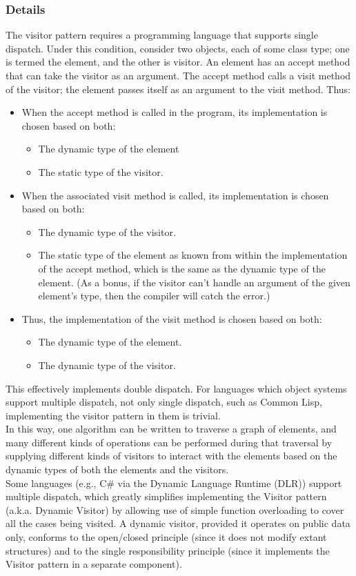 \subsubsection{Details}
The visitor pattern requires a programming language that supports single dispatch. Under this condition, consider two objects, each of some class type; one is termed the element, and the other is visitor. An element has an accept method that can take the visitor as an argument. The accept method calls a visit method of the visitor; the element passes itself as an argument to the visit method. Thus:
\begin{itemize}
	\item When the accept method is called in the program, its implementation is chosen based on both:
	\begin{itemize}
		\item The dynamic type of the element
		\item The static type of the visitor.
	\end{itemize}
	\item When the associated visit method is called, its implementation is chosen based on both:
	\begin{itemize}
		\item The dynamic type of the visitor.
		\item The static type of the element as known from within the implementation of the accept method, which is the same as the dynamic type of the element. (As a bonus, if the visitor can't handle an argument of the given element's type, then the compiler will catch the error.)
	\end{itemize}
	\item Thus, the implementation of the visit method is chosen based on both:
	\begin{itemize}
		\item The dynamic type of the element.
		\item The dynamic type of the visitor.
	\end{itemize}
\end{itemize}
This effectively implements double dispatch. For languages which object systems support multiple dispatch, not only single dispatch, such as Common Lisp, implementing the visitor pattern in them is trivial.\\
In this way, one algorithm can be written to traverse a graph of elements, and many different kinds of operations can be performed during that traversal by supplying different kinds of visitors to interact with the elements based on the dynamic types of both the elements and the visitors.\\
Some languages (e.g., C\# via the Dynamic Language Runtime (DLR)) support multiple dispatch, which greatly simplifies implementing the Visitor pattern (a.k.a. Dynamic Visitor) by allowing use of simple function overloading to cover all the cases being visited. A dynamic visitor, provided it operates on public data only, conforms to the open/closed principle (since it does not modify extant structures) and to the single responsibility principle (since it implements the Visitor pattern in a separate component).
